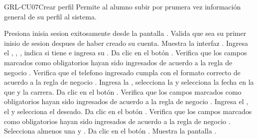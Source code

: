 \begin{UseCase}[]{GRL-CU07}{Crear perfil}{
	Permite al alumno subir por prumera vez información general de su perfil al sistema.
}
\end{UseCase}

\begin{UCtrayectoria}
	\UCpaso [\UCactor] Presiona inisia sesion exitosamente desde la pantalla .
    \UCpaso [\UCsist] Valida que sea su primer inisio de sesion despues de haber creado su cuenta.
	\UCpaso [\UCsist] Muestra la interfaz .
	\UCpaso [\UCactor] Ingresa el , , , 
	indica si tiene  e ingresa su .
	\UCpaso [\UCactor] Da clic en el botón .
	\UCpaso [\UCsist] Verifica que los campos marcados como obligatorios hayan sido ingresados de acuerdo a la
	regla de negocio .
	\UCpaso [\UCsist] Verifica que el telefono ingresado cumpla con el formato correcto de acuerdo a la regla de negocio  .  
	\UCpaso [\UCactor] Ingresa la , selecciona la  y selecciona
	la fecha en la que  y  la carrera.
	\UCpaso [\UCactor] Da clic en el botón .
	\UCpaso [\UCsist] Verifica que los campos marcados como obligatorios hayan sido ingresados de acuerdo a la
	regla de negocio .
	\UCpaso [\UCactor] Ingresa el  , el  y selecciona
	el   deseado.
	\UCpaso [\UCactor] Da clic en el botón .
	\UCpaso [\UCsist] Verifica que los campos marcados como obligatorios hayan sido ingresados de acuerdo a la
	regla de negocio .
	\UCpaso [\UCactor] Selecciona almenos una  y .
	\UCpaso [\UCactor] Da clic en el botón .
	\UCpaso [\UCsist] Muestra la pantalla . %
\end{UCtrayectoria}
